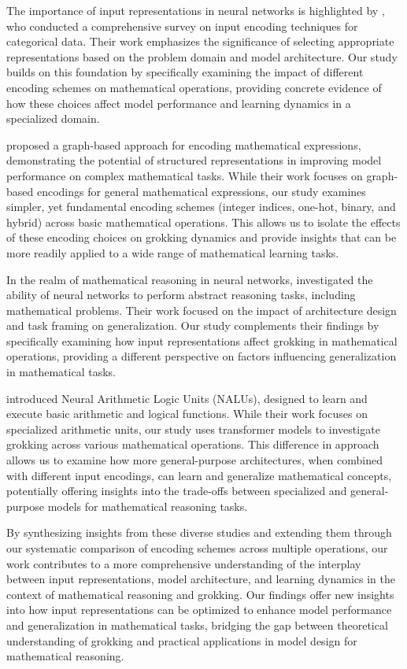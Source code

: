 \documentclass{article} %
\begin{document}
The importance of input representations in neural networks is highlighted by \citet{Hancock2020SurveyOC}, who conducted a comprehensive survey on input encoding techniques for categorical data. Their work emphasizes the significance of selecting appropriate representations based on the problem domain and model architecture. Our study builds on this foundation by specifically examining the impact of different encoding schemes on mathematical operations, providing concrete evidence of how these choices affect model performance and learning dynamics in a specialized domain.

\citet{Feng2021GraphMR} proposed a graph-based approach for encoding mathematical expressions, demonstrating the potential of structured representations in improving model performance on complex mathematical tasks. While their work focuses on graph-based encodings for general mathematical expressions, our study examines simpler, yet fundamental encoding schemes (integer indices, one-hot, binary, and hybrid) across basic mathematical operations. This allows us to isolate the effects of these encoding choices on grokking dynamics and provide insights that can be more readily applied to a wide range of mathematical learning tasks.

In the realm of mathematical reasoning in neural networks, \citet{Santoro2018MeasuringAR} investigated the ability of neural networks to perform abstract reasoning tasks, including mathematical problems. Their work focused on the impact of architecture design and task framing on generalization. Our study complements their findings by specifically examining how input representations affect grokking in mathematical operations, providing a different perspective on factors influencing generalization in mathematical tasks.

\citet{Trask2018NeuralAL} introduced Neural Arithmetic Logic Units (NALUs), designed to learn and execute basic arithmetic and logical functions. While their work focuses on specialized arithmetic units, our study uses transformer models to investigate grokking across various mathematical operations. This difference in approach allows us to examine how more general-purpose architectures, when combined with different input encodings, can learn and generalize mathematical concepts, potentially offering insights into the trade-offs between specialized and general-purpose models for mathematical reasoning tasks.

By synthesizing insights from these diverse studies and extending them through our systematic comparison of encoding schemes across multiple operations, our work contributes to a more comprehensive understanding of the interplay between input representations, model architecture, and learning dynamics in the context of mathematical reasoning and grokking. Our findings offer new insights into how input representations can be optimized to enhance model performance and generalization in mathematical tasks, bridging the gap between theoretical understanding of grokking and practical applications in model design for mathematical reasoning.
\end{document}
